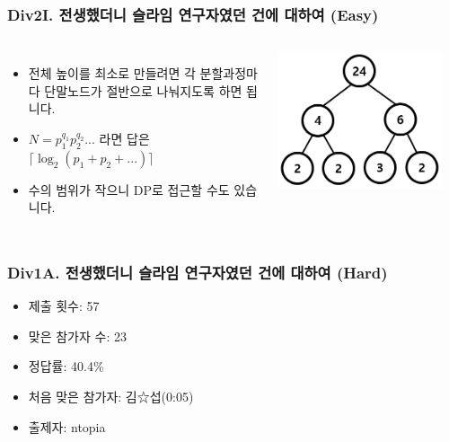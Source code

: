 \documentclass[xetex]{beamer}
\begin{document}
\begin{frame}
  \frametitle{Div2I. 전생했더니 슬라임 연구자였던 건에 대하여 (Easy)}
  \begin{columns}
      \begin{itemize}
        \item 전체 높이를 최소로 만들려면 각 분할과정마다 단말노드가 절반으로 나눠지도록 하면 됩니다.
        \item $N = p_1^{q_1} p_2^{q_2} ...$ 라면 답은 $\lceil \log_2(p_1 + p_2 + ...) \rceil$
        \item 수의 범위가 작으니 DP로 접근할 수도 있습니다.
      \end{itemize}
      \includegraphics[width=0.9\textwidth]{slime-sol-1.png}
  \end{columns}
\end{frame}

\begin{frame}
  \frametitle{Div1A. 전생했더니 슬라임 연구자였던 건에 대하여 (Hard)}
  \begin{itemize}
    \item 제출 횟수: 57
    \item 맞은 참가자 수: 23
    \item 정답률: 40.4\%
    \item 처음 맞은 참가자: 김☆섭(0:05)
    \item 출제자: ntopia
  \end{itemize}
\end{frame}
\end{document}
